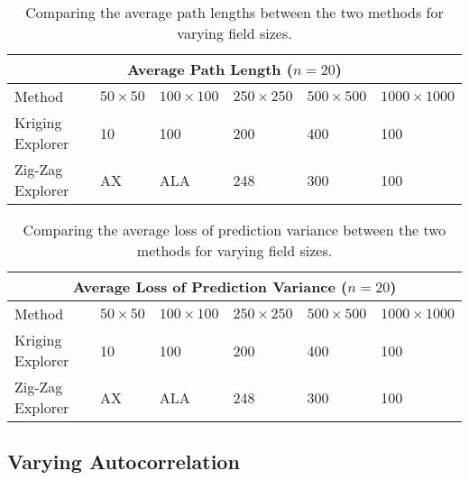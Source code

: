 \begin{table}
\centering
	\begin{tabular}{ |p{3cm}||p{1.5cm}|p{1.5cm}|p{1.5cm}|p{1.5cm}|p{2cm}|  }
		\hline
		\multicolumn{6}{|c|}{Average Path Length ($n=20$)} \\
		\hline
		Method & $50 \times 50$ & $100 \times 100$ & $250 \times 250$ & $500 \times 500$ & $1000 \times 1000$ \\
		\hline
		Kriging Explorer   	& 10 & 100 & 200 & 400 & 100 \\
		Zig-Zag Explorer	& AX & ALA & 248 & 300 & 100 \\
		\hline
	\end{tabular}
	\caption{Comparing the average path lengths between the two methods for varying field sizes.}
    \label{tab:path_lengths}
\end{table}

\begin{table}
\centering
	\begin{tabular}{ |p{3cm}||p{1.5cm}|p{1.5cm}|p{1.5cm}|p{1.5cm}|p{2cm}|  }
		\hline
		\multicolumn{6}{|c|}{Average Loss of Prediction Variance ($n=20$)} \\
		\hline
		Method & $50 \times 50$ & $100 \times 100$ & $250 \times 250$ & $500 \times 500$ & $1000 \times 1000$ \\
		\hline
		Kriging Explorer   	& 10 & 100 & 200 & 400 & 100 \\
		Zig-Zag Explorer	& AX & ALA & 248 & 300 & 100 \\
		\hline
	\end{tabular}
	\caption{Comparing the average loss of prediction variance between the two methods for varying field sizes.}
    \label{tab:path_lengths}
\end{table}





\subsection{Varying Autocorrelation}



